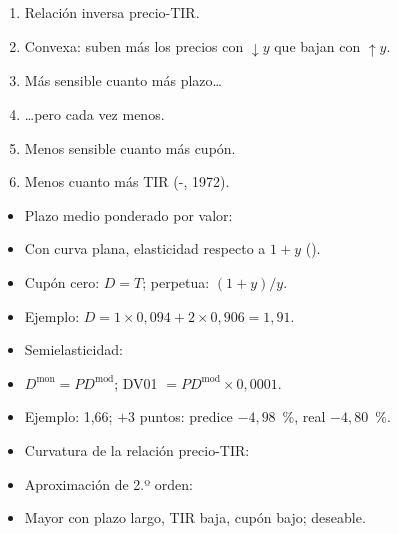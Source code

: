 \documentclass{article}
\begin{document}
\begin{columnas}
\begin{enumerate}
\item Relación inversa precio-TIR.
\item Convexa: suben más los precios con $\downarrow y$ que bajan con $\uparrow y$.
\item Más sensible cuanto más plazo\dots
\item \dots pero cada vez menos.
\item Menos sensible cuanto más cupón.
\item Menos cuanto más TIR (-, 1972).
\end{enumerate}
\begin{itemize}
\item Plazo medio ponderado por valor:
\item Con curva plana, elasticidad respecto a $1+y$ ().
\item Cupón cero: $D=T$; perpetua: $(1+y)/y$.
\item Ejemplo: $D=1\times0{,}094+2\times0{,}906=1{,}91$.
\end{itemize}
\begin{itemize}
\item Semielasticidad:
\item $D^{\mathrm{mon}}=PD^{\mathrm{mod}}$; DV01 $=PD^{\mathrm{mod}}\times0{,}0001$.
\item Ejemplo: 1,66; $+3$ puntos: predice $-4{,}98$~\%, real $-4{,}80$~\%.
\end{itemize}
\begin{itemize}
\item Curvatura de la relación precio-TIR:
\item Aproximación de 2.º orden:
\item Mayor con plazo largo, TIR baja, cupón bajo; deseable.

\end{itemize}
\end{columnas}
\end{document}
